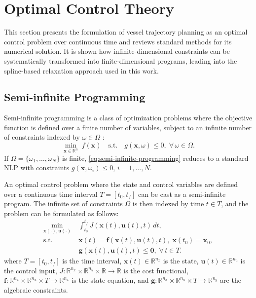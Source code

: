 


\section{Optimal Control Theory}
This section presents the formulation of vessel trajectory planning as an optimal control problem over continuous time and reviews standard methods for its numerical solution. It is shown how infinite-dimensional constraints can be systematically transformed into finite-dimensional programs, leading into the spline-based relaxation approach used in this work.


\subsection{Semi-infinite Programming}\label{sec:semi-infinite-programming}

Semi-infinite programming is a class of optimization problems where the objective function is defined over a finite number of variables, subject to an infinite number of constraints  indexed by $\omega\in\Omega$ \citep{Bonnans2013-gt}:
\begin{equation}\label{eq:semi-infinite-programming}
  \min_{\mathbf x\in\mathbb R^n}\; f(\mathbf x)
  \quad\text{s.t.}\quad g(\mathbf x,\omega)\le0,\;\forall\,\omega\in\Omega.
\end{equation}
If $\Omega=\{\omega_1,\dots,\omega_N\}$ is finite, \eqref{eq:semi-infinite-programming} reduces to a standard \acrfull{NLP} with constraints $g(\mathbf x,\omega_i)\le0$, $i=1,\dots,N$.

An optimal control problem where the state and control variables are defined over a continuous time interval $T=[t_0,t_f]$ can be cast as a semi-infinite program.  The infinite set of constraints $\Omega$ is then indexed by time $t\in T$, and the problem can be formulated as follows:
\begin{equation}\label{eq:optimal-control-problem}
  \begin{aligned}
    \min_{\mathbf{x}(\cdot),\mathbf{u}(\cdot)}\;&\int_{t_0}^{t_f}J(\mathbf x(t),\mathbf u(t),t)\,dt,\\
    \text{s.t.}\;&\dot{\mathbf x}(t)=\mathbf f(\mathbf x(t),\mathbf u(t),t),\;\mathbf x(t_0)=\mathbf x_0,\\
                &\mathbf g(\mathbf x(t),\mathbf u(t),t)\le\mathbf 0,\;\forall\,t\in T.
  \end{aligned}
\end{equation}
where $T = [t_0, t_f]$ is the time interval, $\mathbf{x}(t) \in \mathbb R^{n_x}$ is the state, $\mathbf{u}(t) \in \mathbb R^{n_u}$ is the control input, $J : \mathbb R^{n_x} \times \mathbb R^{n_u} \times \mathbb R \to \mathbb R$ is the cost functional, $\mathbf f : \mathbb R^{n_x} \times \mathbb R^{n_u} \times T \to \mathbb R^{n_x}$ is the state equation, and $\mathbf g : \mathbb R^{n_x} \times \mathbb R^{n_u} \times T \to \mathbb R^{n_g}$ are the algebraic constraints. 


